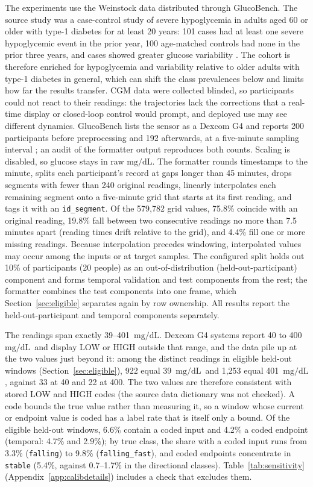 \documentclass[10pt,twocolumn]{article}
\newcommand{\mgdl}{\ensuremath{\mathrm{mg/dL}}}
\begin{document}
The experiments use the Weinstock data distributed through GlucoBench. The
source study was a case-control study of severe hypoglycemia in adults aged
60 or older with type-1 diabetes for at least 20 years: 101 cases had at
least one severe hypoglycemic event in the prior year, 100 age-matched
controls had none in the prior three years, and cases showed greater
glucose variability \cite{weinstock2016risk}. The cohort is therefore
enriched for hypoglycemia and variability relative to older adults with
type-1 diabetes in general, which can shift the class prevalences below
and limits how far the results transfer. CGM data were collected blinded,
so participants could not react to their readings: the trajectories lack
the corrections that a real-time display or closed-loop control would
prompt, and deployed use may see different dynamics. GlucoBench lists the
sensor as a Dexcom G4 and reports 200 participants before preprocessing and
192 afterwards, at a five-minute sampling interval
\cite{sergazinov2024glucobench}; an audit of the formatter output
reproduces both counts. Scaling is disabled, so glucose stays in raw
\mgdl. The formatter rounds timestamps to the minute, splits each
participant's record at gaps longer than 45 minutes, drops segments with
fewer than 240 original readings, linearly interpolates each remaining
segment onto a five-minute grid that starts at its first reading, and tags
it with an \texttt{id\_segment}. Of the 579,782 grid values, 75.8\%
coincide with an original reading, 19.8\% fall between two consecutive
readings no more than 7.5 minutes apart (reading times drift relative to
the grid), and 4.4\% fill one or more missing readings. Because
interpolation precedes windowing, interpolated values may occur among the
inputs or at target samples. The configured split holds out
10\% of participants (20 people) as an out-of-distribution
(held-out-participant) component and
forms temporal validation and test components from the rest; the formatter
combines the test components into one frame, which
Section~\ref{sec:eligible} separates again by row ownership. All results
report the held-out-participant and temporal components separately.

The readings span exactly 39--401~\mgdl. Dexcom G4 systems report 40 to
400~\mgdl\ and display LOW or HIGH outside that range, and the data pile up
at the two values just beyond it: among the distinct readings in eligible
held-out windows (Section~\ref{sec:eligible}), 922 equal 39~\mgdl\ and
1,253 equal 401~\mgdl, against 33 at 40 and 22 at 400. The two values are
therefore consistent with stored LOW and HIGH codes (the source data
dictionary was not checked). A code bounds the true value rather than
measuring it, so a window whose current or endpoint value is coded has a
label rate that is itself only a bound. Of the eligible held-out windows,
6.6\% contain a coded input and 4.2\% a coded endpoint (temporal: 4.7\%
and 2.9\%); by true class, the share with a coded input runs from 3.3\%
(\texttt{falling}) to 9.8\% (\texttt{falling\_fast}), and coded endpoints
concentrate in \texttt{stable} (5.4\%, against 0.7--1.7\% in the
directional classes). Table~\ref{tab:sensitivity}
(Appendix~\ref{app:calibdetails}) includes a check that excludes them.
\end{document}
